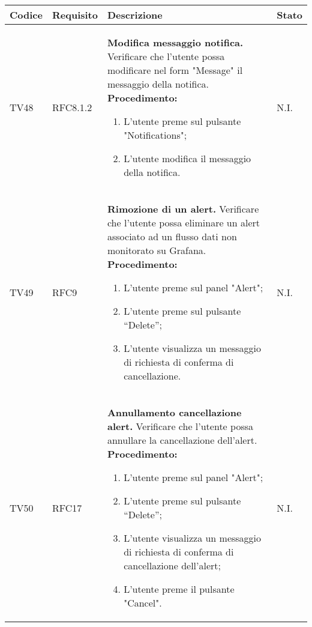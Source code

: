 \begin{table}[!htpb]
	\centering
	\renewcommand{\arraystretch}{2} 
	\begin{tabular}{|l|l|p{10cm}|l|}
		\rowcolor{orange!50}
		\hline
		\textbf{Codice} & \textbf{Requisito}& \textbf{Descrizione} & \textbf{Stato}\\ 
		\hline
		TV48 & RFC8.1.2 &
			\textbf{Modifica messaggio notifica.}
			\newline
			Verificare che l'utente possa modificare nel form "Message" il messaggio della notifica.
			\newline
			\textbf{Procedimento:}
			\begin{enumerate}
				\item L'utente preme sul pulsante "Notifications"; 
				\item L’utente modifica il messaggio della notifica.
			\end{enumerate} 
			& N.I.\\
		\hline
		TV49 & RFC9 &
			\textbf{Rimozione di un alert.} 
			\newline
			Verificare che l’utente possa eliminare un alert associato ad un flusso dati non monitorato su Grafana. 
			\newline 
			\textbf{Procedimento:} 
			\begin{enumerate} 
				\item L'utente preme sul panel "Alert"; 
				\item L’utente preme sul pulsante “Delete”; 
				\item L’utente visualizza un messaggio di richiesta di conferma di cancellazione.		
			\end{enumerate} 
			& N.I.\\
		\hline
		TV50 & RFC17 &
			\textbf{Annullamento cancellazione alert.} 
			\newline
			Verificare che l’utente possa annullare la cancellazione dell'alert. 
			\newline 
			\textbf{Procedimento:} 
			\begin{enumerate} 
				\item L'utente preme sul panel "Alert"; 
				\item L’utente preme sul pulsante “Delete”; 
				\item L'utente visualizza un messaggio di richiesta di conferma di cancellazione dell'alert;
				\item L'utente preme il pulsante "Cancel".		
			\end{enumerate} 
			& N.I.\\
		\hline
	\end{tabular}
\end{table}
